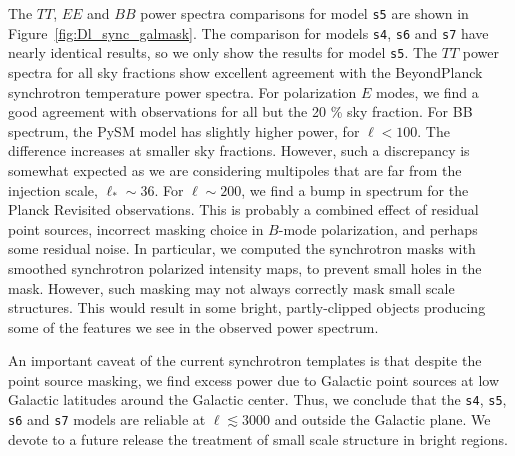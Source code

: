 \documentclass[twocolumn]{aastex631}
\begin{document}
The $TT$, $EE$ and $BB$ power spectra comparisons for model \texttt{s5} are shown in Figure~\ref{fig:Dl_sync_galmask}. The comparison for models \texttt{s4}, \texttt{s6} and \texttt{s7} have nearly identical results, so we only show the results for model \texttt{s5}. The $TT$ power spectra for all sky fractions show excellent agreement with the BeyondPlanck synchrotron temperature power spectra. For polarization $E$ modes, we find a good agreement with observations for all but the 20 \% sky fraction. 
For BB spectrum, the PySM model has slightly higher power, for $\ell < 100$. The difference increases at smaller sky fractions. However, such a discrepancy is somewhat expected as we are considering multipoles that are far from the injection scale, $\ell_*\sim36$.
For $\ell \sim 200$, we find a bump in spectrum for the Planck Revisited observations. This is probably a combined effect of residual point sources, incorrect masking choice in $B$-mode polarization, and perhaps some residual noise. In particular, we computed the synchrotron masks with smoothed synchrotron polarized intensity maps, to prevent small holes in the mask. However, such masking may not always correctly mask small scale structures. This would result in some bright, partly-clipped objects producing some of the features we see in the observed power spectrum. 

An important caveat of the current synchrotron templates is that despite the point source masking, we find excess power due to Galactic point sources at low  Galactic  latitudes around the Galactic center. Thus, we conclude that the \texttt{s4}, \texttt{s5}, \texttt{s6} and \texttt{s7} models are reliable at $\ell \lesssim 3000$ and outside the Galactic plane. We devote to a future release the treatment of small scale structure in bright regions.
\end{document}
